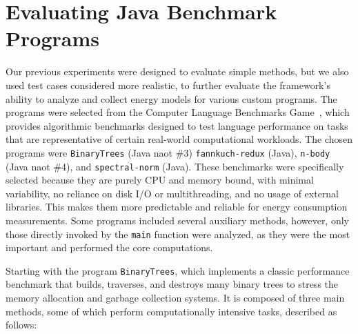 

\section{Evaluating Java Benchmark Programs} \label{sec:evaluating_java_benchmark_programs}

Our previous experiments were designed to evaluate simple methods, but we also used test cases considered more realistic, to further evaluate the framework’s ability to analyze and collect energy models for various custom programs. The programs were selected from the Computer Language Benchmarks Game~\cite{benchmarksGameJava}, which provides algorithmic benchmarks designed to test language performance on tasks that are representative of certain real-world computational workloads. The chosen programs were \texttt{BinaryTrees} (Java naot \#3) \texttt{fannkuch-redux} (Java), \texttt{n-body} (Java naot \#4), and \texttt{spectral-norm} (Java). These benchmarks were specifically selected because they are purely CPU and memory bound, with minimal variability, no reliance on disk I/O or multithreading, and no usage of external libraries. This makes them more predictable and reliable for energy consumption measurements. Some programs included several auxiliary methods, however, only those directly invoked by the \texttt{main} function were analyzed, as they were the most important and performed the core computations.


Starting with the program \texttt{BinaryTrees}, which implements a classic performance benchmark that builds, traverses, and destroys many binary trees to stress the memory allocation and garbage collection systems. It is composed of three main methods, some of which perform computationally intensive tasks, described as follows:

